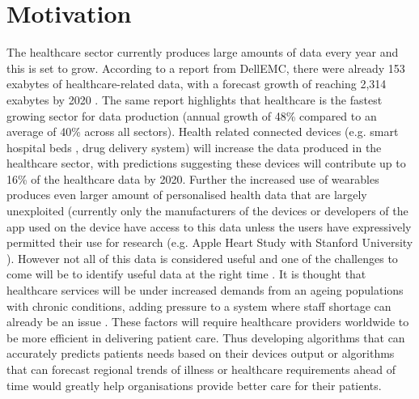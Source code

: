 \section{Motivation}
The healthcare sector currently produces large amounts of data every year and this is set to grow.  According to a report from DellEMC, there were already 153 exabytes of healthcare-related data, with a forecast growth of reaching 2,314 exabytes by 2020 \cite{EMC:2014ve}. The same report highlights that healthcare is the fastest growing sector for data production (annual growth of 48\% compared to an average of 40\% across all sectors).  Health related connected devices (e.g. smart hospital beds , drug delivery system) will increase the data produced in the healthcare sector, with predictions suggesting these devices will contribute up to 16\% of the healthcare data by 2020.
Further the increased use of wearables produces even larger amount of personalised health data that are largely unexploited (currently only the manufacturers of the devices or developers of the app used on the device have access to this data unless the users have expressively permitted their use for research (e.g. Apple Heart Study with Stanford University \cite{Anonymous:I2FTN6O4, Medicine:2017wa}). 
However not all of this data is considered useful and one of the challenges to come will be to identify useful data at the right time \cite{EMC:2014ve}.
It is thought that healthcare services will be under increased demands from an ageing populations with chronic conditions, adding pressure to a system where staff shortage can already be an issue \cite{Medicine:2017wa}.
These factors will require healthcare providers worldwide to be more efficient in delivering patient care. Thus developing algorithms that can accurately predicts patients needs based on their devices output or algorithms that can forecast regional trends of illness or healthcare requirements ahead of time would greatly help organisations provide better care for their patients.

